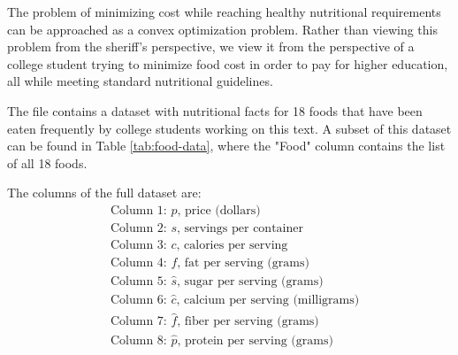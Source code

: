 The problem of minimizing cost while reaching healthy nutritional requirements can be approached as a convex optimization problem.
Rather than viewing this problem from the sheriff's perspective, we view it from the perspective of a college student trying to minimize food cost in order to pay for higher education, all while meeting standard nutritional guidelines.

The file  contains a dataset with nutritional facts for 18 foods that have been eaten frequently by college students working on this text.
A subset of this dataset can be found in Table \ref{tab:food-data}, where the "Food" column contains the list of all 18 foods.

The columns of the full dataset are:
\begin{align*}
& \text{Column 1: $p$, price (dollars)} \\
& \text{Column 2: $s$, servings per container} \\
& \text{Column 3: $c$, calories per serving} \\
& \text{Column 4: $f$, fat per serving (grams)} \\
& \text{Column 5: $\hat{s}$, sugar per serving (grams)} \\
& \text{Column 6: $\hat{c}$, calcium per serving (milligrams)} \\
& \text{Column 7: $\hat{f}$, fiber per serving (grams)} \\
& \text{Column 8: $\hat{p}$, protein per serving (grams)}
\end{align*}



